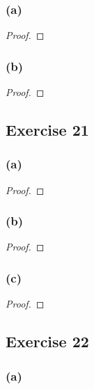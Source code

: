 \documentclass[14pt]{extarticle}
\begin{document}
\subsubsection{(a)}

\begin{proof}

\end{proof}

\subsubsection{(b)}

\begin{proof}

\end{proof}

\subsection{Exercise 21}

\subsubsection{(a)}

\begin{proof}

\end{proof}

\subsubsection{(b)}

\begin{proof}

\end{proof}

\subsubsection{(c)}

\begin{proof}

\end{proof}

\subsection{Exercise 22}

\subsubsection{(a)}
\end{document}
